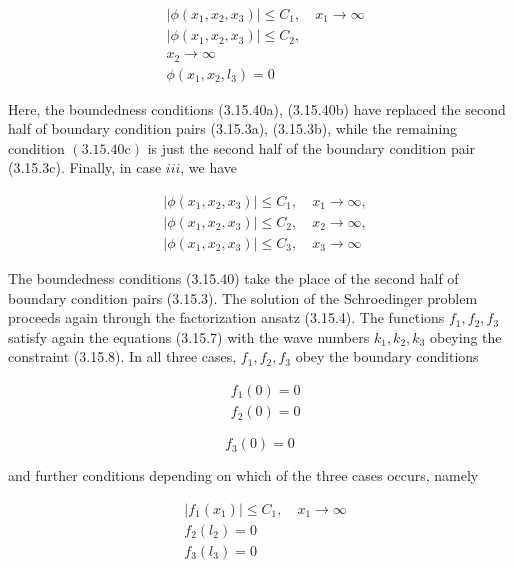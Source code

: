 \documentclass{article}
\begin{document}
\begin{align*}
& \left|\phi\left(x_{1}, x_{2}, x_{3}\right)\right| \leq C_{1}, \quad x_{1} \rightarrow \infty  \tag{3.15.40a}\\
& \left|\phi\left(x_{1}, x_{2}, x_{3}\right)\right| \leq C_{2},  \tag{3.15.40b}\\
& x_{2} \rightarrow \infty  \tag{3.15.40c}\\
& \phi\left(x_{1}, x_{2}, l_{3}\right)=0
\end{align*}
 

Here, the boundedness conditions (3.15.40a), (3.15.40b) have replaced the second half of boundary condition pairs (3.15.3a), (3.15.3b), while the remaining condition $(3.15 .40 \mathrm{c})$ is just the second half of the boundary condition pair (3.15.3c). Finally, in case $i i i$, we have
 
\begin{align*}
& \left|\phi\left(x_{1}, x_{2}, x_{3}\right)\right| \leq C_{1}, \quad x_{1} \rightarrow \infty,  \tag{3.15.41a}\\
& \left|\phi\left(x_{1}, x_{2}, x_{3}\right)\right| \leq C_{2}, \quad x_{2} \rightarrow \infty,  \tag{3.15.41b}\\
& \left|\phi\left(x_{1}, x_{2}, x_{3}\right)\right| \leq C_{3}, \quad x_{3} \rightarrow \infty \tag{3.15.41c}
\end{align*}
 

The boundedness conditions (3.15.40) take the place of the second half of boundary condition pairs (3.15.3). The solution of the Schroedinger problem proceeds again through the factorization ansatz (3.15.4). The functions $f_{1}, f_{2}, f_{3}$ satisfy again the equations (3.15.7) with the wave numbers $k_{1}, k_{2}, k_{3}$ obeying the constraint (3.15.8). In all three cases, $f_{1}, f_{2}, f_{3}$ obey the boundary conditions
 
\begin{align*}
& f_{1}(0)=0  \tag{3.15.42a}\\
& f_{2}(0)=0 \tag{3.15.42b}
\end{align*}
 
 
\begin{equation*}
f_{3}(0)=0 \tag{3.15.42c}
\end{equation*}
 
and further conditions depending on which of the three cases occurs, namely
 
\begin{align*}
& \left|f_{1}\left(x_{1}\right)\right| \leq C_{1}, \quad x_{1} \rightarrow \infty  \tag{3.15.43a}\\
& f_{2}\left(l_{2}\right)=0  \tag{3.15.43b}\\
& f_{3}\left(l_{3}\right)=0 \tag{3.15.43c}
\end{align*}
 
\end{document}
